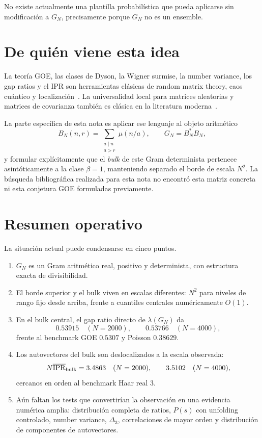 \documentclass[11pt,a4paper]{article}
\newcommand{\IPR}{\operatorname{IPR}}
\begin{document}
No existe actualmente una plantilla probabilística que pueda aplicarse sin modificación a $G_N$, precisamente porque $G_N$ no es un ensemble.

\section{De quién viene esta idea}

La teoría GOE, las clases de Dyson, la Wigner surmise, la number variance, los gap ratios y el IPR son herramientas clásicas de random matrix theory, caos cuántico y localización~\cite{Mehta2004,Haake2018,OganesyanHuse2007,Atas2013}. La universalidad local para matrices aleatorias y matrices de covarianza también es clásica en la literatura moderna~\cite{ErdosYau2012,ErdosYauYin2012,TaoVuCov2012}.

La parte específica de esta nota es aplicar ese lenguaje al objeto aritmético
\begin{equation}
B_N(n,r)=\sum_{\substack{a\mid n\\a>r}}\mu(n/a),
\qquad
G_N=B_N^*B_N,
\end{equation}
y formular explícitamente que el \emph{bulk} de este Gram determinista pertenece asintóticamente a la clase $\beta=1$, manteniendo separado el borde de escala $N^2$. La búsqueda bibliográfica realizada para esta nota no encontró esta matriz concreta ni esta conjetura GOE formuladas previamente.

\section{Resumen operativo}

La situación actual puede condensarse en cinco puntos.

\begin{enumerate}
\item $G_N$ es un Gram aritmético real, positivo y determinista, con estructura exacta de divisibilidad.
\item El borde superior y el bulk viven en escalas diferentes: $N^2$ para niveles de rango fijo desde arriba, frente a cuantiles centrales numéricamente $O(1)$.
\item En el bulk central, el gap ratio directo de $\lambda(G_N)$ da
\[
0.53915\quad(N=2000),\qquad
0.53766\quad(N=4000),
\]
frente al benchmark GOE $0.5307$ y Poisson $0.38629$.
\item Los autovectores del bulk son deslocalizados a la escala observada:
\[
N\overline{\IPR}_{\rm bulk}=3.4863\quad(N=2000),\qquad
3.5102\quad(N=4000),
\]
cercanos en orden al benchmark Haar real $3$.
\item Aún faltan los tests que convertirían la observación en una evidencia numérica amplia: distribución completa de ratios, $P(s)$ con unfolding controlado, number variance, $\Delta_3$, correlaciones de mayor orden y distribución de componentes de autovectores.
\end{enumerate}
\end{document}
